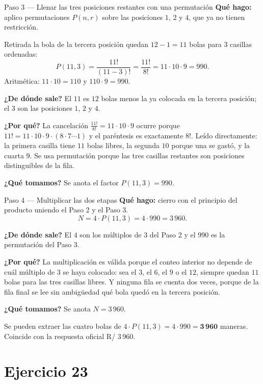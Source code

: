 \documentclass[11pt]{article}
\begin{document}
\begin{paso}{Paso 3 --- Llenar las tres posiciones restantes con una permutación}
\textbf{Qué hago:} aplico permutaciones $P(n,r)$ sobre las posiciones $1$, $2$ y $4$, que ya no tienen restricción.

Retirada la bola de la tercera posición quedan $12-1=11$ bolas para $3$ casillas ordenadas:
\[
  P(11,3)=\frac{11!}{(11-3)!}=\frac{11!}{8!}=11\cdot 10\cdot 9 = 990 .
\]
Aritmética: $11\cdot 10=110$ y $110\cdot 9=990$.

\textbf{¿De dónde sale?} El $11$ es $12$ bolas menos la ya colocada en la tercera posición; el $3$ son las posiciones $1$, $2$ y $4$.

\textbf{¿Por qué?} La cancelación $\frac{11!}{8!}=11\cdot 10\cdot 9$ ocurre porque $11!=11\cdot 10\cdot 9\cdot(8\cdot 7\cdots 1)$ y el paréntesis es exactamente $8!$. Leído directamente: la primera casilla tiene $11$ bolas libres, la segunda $10$ porque una se gastó, y la cuarta $9$. Se usa permutación porque las tres casillas restantes son posiciones distinguibles de la fila.

\textbf{¿Qué tomamos?} Se anota el factor $P(11,3)=990$.
\end{paso}

\begin{paso}{Paso 4 --- Multiplicar las dos etapas}
\textbf{Qué hago:} cierro con el principio del producto uniendo el Paso 2 y el Paso 3.
\[
  N = 4\cdot P(11,3) = 4\cdot 990 = 3\,960 .
\]

\textbf{¿De dónde sale?} El $4$ son los múltiplos de $3$ del Paso 2 y el $990$ es la permutación del Paso 3.

\textbf{¿Por qué?} La multiplicación es válida porque el conteo interior no depende de cuál múltiplo de $3$ se haya colocado: sea el $3$, el $6$, el $9$ o el $12$, siempre quedan $11$ bolas para las tres casillas libres. Y ninguna fila se cuenta dos veces, porque de la fila final se lee sin ambigüedad qué bola quedó en la tercera posición.

\textbf{¿Qué tomamos?} Se anota $N=3\,960$.
\end{paso}

\begin{resp}
Se pueden extraer las cuatro bolas de $4\cdot P(11,3)=4\cdot 990=\mathbf{3\,960}$ maneras. Coincide con la respuesta oficial R/ 3\,960.
\end{resp}

\section*{Ejercicio 23}
\end{document}
